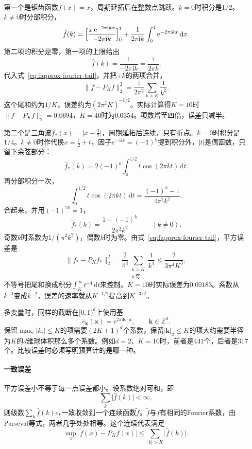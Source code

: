 第一个是锯齿函数$f(x)=x$，周期延拓后在整数点跳跃。$k=0$时积分是$1/2$。$k\neq0$时分部积分，
\[
 \hat f(k)=\Bigl[\frac{x\,\mathrm e^{-2\pi\mathrm ikx}}{-2\pi\mathrm ik}\Bigr]_0^1+\frac1{2\pi\mathrm ik}\int_0^1\mathrm e^{-2\pi\mathrm ikx}\,\mathrm dx .
\]
第二项的积分是零，第一项的上限给出
\[
 \hat f(k)=\frac1{-2\pi\mathrm ik}=\frac{\mathrm i}{2\pi k}.
\]
代入式~\eqref{eq:fapprox-fourier-tail}，并把$\pm k$的两项合并，
\[
 \lVert f-P_Kf\rVert_2^2=\frac1{2\pi^2}\sum_{k>K}\frac1{k^2}.
\]
这个尾和约为$1/K$，误差约为$(2\pi^2K)^{-1/2}$。实际计算得$K=10$时$\lVert f-P_Kf\rVert_2=0.0694$，$K=40$时为$0.0354$。项数增至四倍，误差只减半。

第二个是三角波$f_*(x)=\lvert x-\frac12\rvert$，周期延拓后连续，只有折点。$k=0$时积分是$1/4$。$k\neq0$时作代换$x=\frac12+t$，因子$\mathrm e^{-\pi\mathrm ik}=(-1)^k$提到积分外，$\lvert t\rvert$是偶函数，只留下余弦部分：
\[
 \hat f_*(k)=2(-1)^k\int_0^{1/2}t\cos(2\pi kt)\,\mathrm dt .
\]
再分部积分一次，
\[
 \int_0^{1/2}t\cos(2\pi kt)\,\mathrm dt=\frac{(-1)^k-1}{4\pi^2k^2}.
\]
合起来，并用$(-1)^{2k}=1$，
\[
 \hat f_*(k)=\frac{1-(-1)^k}{2\pi^2k^2}\qquad(k\neq0).
\]
奇数$k$时系数为$1/(\pi^2k^2)$，偶数$k$时为零。由式~\eqref{eq:fapprox-fourier-tail}，平方误差是
\[
 \lVert f_*-P_Kf_*\rVert_2^2=\frac2{\pi^4}\sum_{\substack{k>K\\k\ \text{奇}}}\frac1{k^4}\leq\frac2{3\pi^4K^3},
\]
不等号把尾和换成积分$\int_K^\infty t^{-4}\,\mathrm dt$来控制。$K=10$时实际误差为$0.00183$。系数从$k^{-1}$变成$k^{-2}$，误差的速率就从$K^{-1/2}$提高到$K^{-3/2}$。

多变量时，同样的截断在$[0,1)^d$上使用基
\[
 e_{\bm k}(\bm x)=\mathrm e^{2\pi\mathrm i\bm k\cdot\bm x},\qquad \bm k\in\mathbb Z^d .
\]
保留$\max_i\lvert k_i\rvert\leq K$的项需要$(2K+1)^d$个系数，保留$\lvert\bm k\rvert_2\leq K$的项大约需要半径为$K$的$d$维球体积那么多个系数。例如$d=2$、$K=10$时，前者是$441$个，后者是$317$个。比较误差时必须写明预算计的是哪一种。

\paragraph{一致误差}
平方误差小不等于每一点误差都小。设系数绝对可和，即
\[
 \sum_k\lvert\hat f(k)\rvert<\infty ,
\]
则级数$\sum_k\hat f(k)e_k$一致收敛到一个连续函数$\tilde f$。$\tilde f$与$f$有相同的Fourier系数，由Parseval等式，两者几乎处处相等。这个连续代表满足
\begin{equation}
 \sup_x\bigl\lvert\tilde f(x)-P_Kf(x)\bigr\rvert\leq\sum_{\lvert k\rvert>K}\lvert\hat f(k)\rvert .
 \label{eq:fapprox-uniform-tail}
\end{equation}

